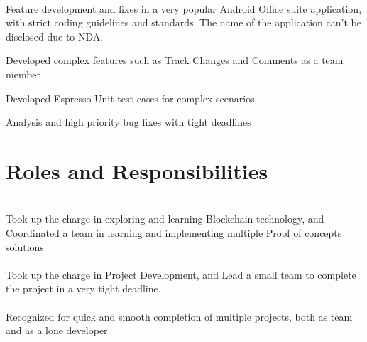 \documentclass[]{deedy-resume-openfont}
\begin{document}
\\
Feature development and fixes in a very popular Android Office suite application, with strict coding guidelines and standards. The name of the application can’t be disclosed due to NDA.\\
\begin{tightemize}
	\item Developed complex features such as Track Changes and Comments as a team member
	\item Developed Espresso Unit test cases for complex scenarios
	\item Analysis and high priority bug fixes with tight deadlines
\end{tightemize}
\sectionsep


\section{Roles and Responsibilities}
  \\
Took up the charge in exploring and learning Blockchain technology, and Coordinated a team in learning and implementing multiple Proof of concepts solutions\\
\sectionsep
{}  \\
Took up the charge in Project Development, and Lead a small team to complete the project in a very tight deadline.\\
\sectionsep
{}  \\
Recognized for quick and smooth completion of multiple projects, both as team and as a lone developer.\\
\sectionsep
\ 
\end{document}

